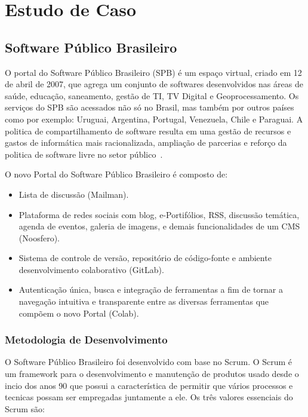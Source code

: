 \chapter{Estudo de Caso}
\label{est}
\section{Software Público Brasileiro}
\label{est:sof}

O portal do Software Público Brasileiro (SPB) é um espaço virtual, criado em 12 de 
abril de 2007, que agrega um conjunto de softwares desenvolvidos nas áreas de saúde, 
educação, saneamento, gestão de TI, TV Digital e Geoprocessamento. Os serviços do
SPB são acessados não só no Brasil, mas também por outros países como por exemplo:
Uruguai, Argentina, Portugal, Venezuela, Chile e Paraguai. A politica de compartilhamento
de software resulta em uma gestão de recursos e gastos de informática mais racionalizada,
ampliação de parcerias e reforço da politica de software livre no setor público~\cite{spb}.

O novo Portal do Software Público Brasileiro é composto de:

\begin{itemize}
    \item Lista de discussão (Mailman).
    \item Plataforma de redes sociais com blog, e-Portifólios, RSS, discussão 
    temática, agenda de eventos, galeria de imagens, e demais funcionalidades de um CMS (Noosfero).
    \item Sistema de controle de versão, repositório de código-fonte e ambiente 
    desenvolvimento colaborativo (GitLab).
    \item Autenticação única, busca e integração de ferramentas a fim de tornar 
    a navegação intuitiva e transparente entre as diversas ferramentas que compõem 
    o novo Portal (Colab).
\end{itemize}

\subsection{Metodologia de Desenvolvimento}
\label{est:sof:met}

O Software Público Brasileiro foi desenvolvido com base no Scrum. O
Scrum é um framework para o desenvolvimento e manutenção de produtos usado desde
o incio dos anos 90 que possui a característica de permitir que vários processos
e tecnicas possam ser empregadas juntamente a ele. Os três valores essenciais do
Scrum são:

